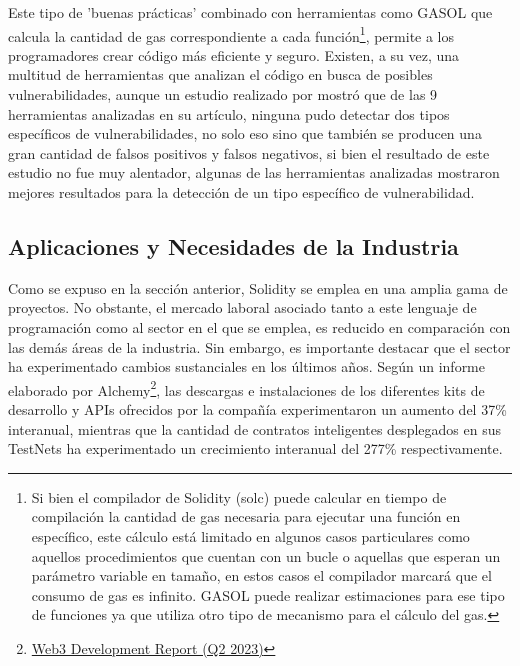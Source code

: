 \documentclass[a4paper,10pt]{article}
\begin{document}
	Este tipo de 'buenas prácticas' combinado con herramientas como GASOL \parencite{albert2020gasol} que calcula la cantidad de gas correspondiente a cada función\footnote{Si bien el compilador de Solidity (solc) puede calcular en tiempo de compilación la cantidad de gas necesaria para ejecutar una función en específico, este cálculo está limitado en algunos casos particulares como aquellos procedimientos que cuentan con un bucle o aquellas que esperan un parámetro variable en tamaño, en estos casos el compilador marcará que el consumo de gas es infinito. GASOL puede realizar estimaciones para ese tipo de funciones ya que utiliza otro tipo de mecanismo para el cálculo del gas.}, permite a los programadores crear código más eficiente y seguro. Existen, a su vez, una multitud de herramientas que analizan el código en busca de posibles vulnerabilidades, aunque un estudio realizado por \textcite{durieux2020empirical} mostró que de las 9 herramientas analizadas en su artículo, ninguna pudo detectar dos tipos específicos de vulnerabilidades, no solo eso sino que también se producen una gran cantidad de falsos positivos y falsos negativos, si bien el resultado de este estudio no fue muy alentador, algunas de las herramientas analizadas mostraron mejores resultados para la detección de un tipo específico de vulnerabilidad.
	\subsection{Aplicaciones y Necesidades de la Industria}
	Como se expuso en la sección anterior, Solidity se emplea en una amplia gama de proyectos. No obstante, el mercado laboral asociado tanto a este lenguaje de programación como al sector en el que se emplea, es reducido en comparación con las demás áreas de la industria. Sin embargo, es importante destacar que el sector ha experimentado cambios sustanciales en los últimos años. Según un informe elaborado por Alchemy\footnote{\href{https://www.alchemy.com/blog/web3-developer-report-q2-2023}{Web3 Development Report (Q2 2023)}}, las descargas e instalaciones de los diferentes kits de desarrollo y APIs ofrecidos por la compañía experimentaron un aumento del 37\% interanual, mientras que la cantidad de contratos inteligentes desplegados en sus TestNets ha experimentado un crecimiento interanual del 277\% respectivamente.
	
\end{document}

